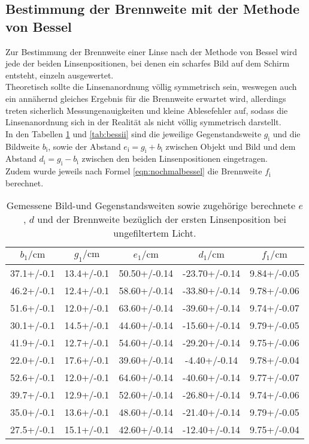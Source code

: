 \subsection{Bestimmung der Brennweite mit der Methode von Bessel}
Zur Bestimmung der Brennweite einer Linse nach der Methode von Bessel wird jede der beiden Linsenpositionen, bei denen ein scharfes Bild auf dem Schirm entsteht, einzeln ausgewertet. \\
Theoretisch sollte die Linsenanordnung völlig symmetrisch sein, weswegen auch ein annähernd gleiches Ergebnis für die Brennweite erwartet wird, allerdings treten sicherlich Messungenauigkeiten und kleine Ablesefehler auf, sodass die Linsenanordnung sich in der Realität als nicht völlig symmetrisch darstellt.
\\In den Tabellen \ref{tab:besseli} und \ref{tab:bessii} sind die jeweilige Gegenstandsweite $g_\mathrm{i}$ und die Bildweite $b_\mathrm{i}$, sowie der Abstand $e_\mathrm{i}=g_\mathrm{i} + b_\mathrm{i}$ zwischen Objekt und Bild und dem Abstand $d_\mathrm{i}=g_\mathrm{i} - b_\mathrm{i}$ zwischen den beiden Linsenpositionen eingetragen.
\\Zudem wurde jeweils nach Formel \ref{eqn:nochmalbessel} die Brennweite $f_\mathrm{i}$ berechnet.
\begin{table}
  \caption{Gemessene Bild-und Gegenstandsweiten sowie zugehörige berechnete $e$, $d$ und der Brennweite bezüglich der ersten Linsenposition bei ungefiltertem Licht. }
  \label{tab:besseli}
  \centering
\begin{tabular}{ccccc}
  \toprule
$b_\mathrm{1}/\si{\centi\meter}$ & $g_\mathrm{1}/\si{\centi\meter}$ & $e_\mathrm{1}/\si{\centi\meter}$ & $d_\mathrm{1}/\si{\centi\meter}$ & $f_\mathrm{1}/\si{\centi\meter}$ \\
\midrule
37.1+/-0.1 & 13.4+/-0.1 & 50.50+/-0.14 & -23.70+/-0.14 & 9.84+/-0.05 \\
46.2+/-0.1 & 12.4+/-0.1 & 58.60+/-0.14 & -33.80+/-0.14 & 9.78+/-0.06 \\
51.6+/-0.1 & 12.0+/-0.1 & 63.60+/-0.14 & -39.60+/-0.14 & 9.74+/-0.07 \\
30.1+/-0.1 & 14.5+/-0.1 & 44.60+/-0.14 & -15.60+/-0.14 & 9.79+/-0.05 \\
41.9+/-0.1 & 12.7+/-0.1 & 54.60+/-0.14 & -29.20+/-0.14 & 9.75+/-0.06 \\
22.0+/-0.1 & 17.6+/-0.1 & 39.60+/-0.14 & -4.40+/-0.14 & 9.78+/-0.04 \\
52.6+/-0.1 & 12.0+/-0.1 & 64.60+/-0.14 & -40.60+/-0.14 & 9.77+/-0.07 \\
39.7+/-0.1 & 12.9+/-0.1 & 52.60+/-0.14 & -26.80+/-0.14 & 9.74+/-0.06 \\
35.0+/-0.1 & 13.6+/-0.1 & 48.60+/-0.14 & -21.40+/-0.14 & 9.79+/-0.05 \\
27.5+/-0.1 & 15.1+/-0.1 & 42.60+/-0.14 & -12.40+/-0.14 & 9.75+/-0.04 \\
\bottomrule
\end{tabular}
\end{table}
